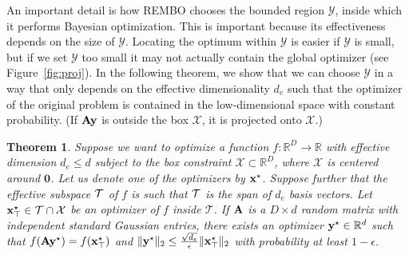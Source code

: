 \documentclass{article}
\newtheorem{theorem}[mydefinition]{Theorem}
\begin{document}
An important detail is how REMBO chooses the bounded region $\mathcal{Y}$, inside which it performs Bayesian optimization. This is important because its effectiveness depends on the size of $\mathcal{Y}$. Locating the optimum within $\mathcal{Y}$ is easier if $\mathcal{Y}$ is small, but if we set $\mathcal{Y}$ too small it may not actually contain the global optimizer (see Figure~\ref{fig:proj}).
In the following theorem, we show that we can choose $\mathcal{Y}$ in a way that only depends on the effective dimensionality $d_e$ such that the optimizer of the original problem is contained in the low-dimensional space with constant probability.
(If $\mathbf{A}\mathbf{y}$ is outside the box $\mathcal{X}$, it is projected onto $\mathcal{X}$.)
\begin{theorem}
\label{prop:2}
Suppose we want to optimize a function $f: \mathbb{R}^{D} \rightarrow \mathbb{R}$ with effective dimension $d_e \leq d$ subject to the box constraint $\mathcal{X} \subset \mathbb{R}^D$, where $\mathcal{X}$ is centered around $\mathbf{0}$. Let us denote one of the optimizers by $\mathbf{x}^{\star}$.
Suppose further that the effective subspace $\cal T$ of $f$ is such that $\cal T$ is the span of $d_e$ basis vectors. 
Let $\mathbf{x}^{\star}_\top \in \cal{T} \cap \mathcal{X}$ be an optimizer of $f$ inside $\mathcal{T}$. 
If $\mathbf{A}$ is a $D\times d$ random matrix with independent standard Gaussian entries,
there exists an optimizer $\mathbf{y}^\star \in \mathbb{R}^{d}$ such that $f(\mathbf{A}\mathbf{y}^\star) = f(\mathbf{x}^\star_\top)$ and $\|\mathbf{y}^\star\|_2 \leq \frac{\sqrt{d_e}}{\epsilon}\|\mathbf{x}^{\star}_\top\|_2$ with probability at least $1-\epsilon$.
\end{theorem}
\end{document}

